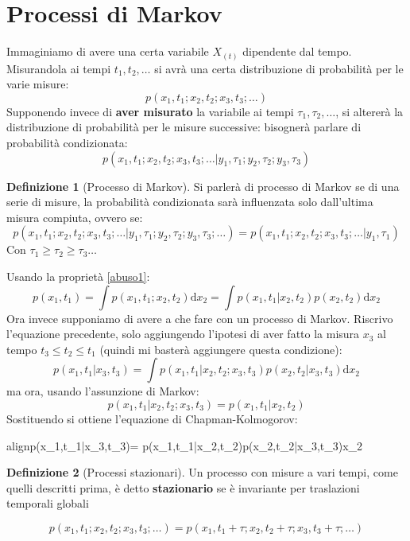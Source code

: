 \documentclass[a4paper,12pt]{article}
\renewcommand{\arg}[1]{_{(#1)}}
\newcommand{\boxedeq}[2]{\begin{empheq}[box={\fboxsep=6pt\fbox}]{align}\label{#1}#2\end{empheq}}
\theoremstyle{plain}
\theoremstyle{definition}
\newtheorem{defn}{Definizione}[section]
\renewcommand{\d}{\text{d}}
\newcommand{\argg}[1]{\left(#1\right)}
\theoremstyle{remark}
\begin{document}
\section{Processi di Markov}
Immaginiamo di avere una certa variabile $X\arg{t}$ dipendente dal tempo. Misurandola ai tempi $t_1,t_2,\ldots$ si avrà una certa distribuzione di probabilità per le varie misure:
\[p\argg{x_1,t_1;x_2,t_2;x_3,t_3;\ldots}		\]
Supponendo invece di \textbf{aver misurato } la variabile ai tempi $\tau_1,\tau_2,\ldots$, si altererà la distribuzione di probabilità per le misure successive: bisognerà parlare di probabilità condizionata:
\[p\argg{x_1,t_1;x_2,t_2;x_3,t_3;\ldots|y_1,\tau_1;y_2,\tau_2;y_3,\tau_3}	\]
\begin{defn}[Processo di Markov]
	Si parlerà di processo di Markov se di una serie di misure, la probabilità condizionata sarà influenzata solo dall'ultima misura compiuta, ovvero se:
\[p\argg{x_1,t_1;x_2,t_2;x_3,t_3;\ldots|y_1,\tau_1;y_2,\tau_2;y_3,\tau_3;\ldots}=p\argg{x_1,t_1;x_2,t_2;x_3,t_3;\ldots|y_1,\tau_1}\]
Con $\tau_1\ge\tau_2\ge\tau_3\ldots$
\end{defn}
Usando la proprietà \ref{abuso1}:
\[p\argg{x_1,t_1}=\int p\argg{x_1,t_1;x_2,t_2}\d x_2=	\int p\argg{x_1,t_1|x_2,t_2}p\argg{x_2,t_2}\d x_2\]
Ora invece supponiamo di avere a che fare con un processo di Markov. Riscrivo l'equazione precedente, solo aggiungendo l'ipotesi di aver fatto la misura $x_3$ al tempo $t_3\le t_2\le t_1$ (quindi mi basterà aggiungere questa condizione):
\[p\argg{x_1,t_1|x_3,t_3}=	\int p\argg{x_1,t_1|x_2,t_2;x_3,t_3}p\argg{x_2,t_2|x_3,t_3}\d x_2\]
ma ora, usando l'assunzione di Markov:
	\[p\argg{x_1,t_1|x_2,t_2;x_3,t_3}=p\argg{x_1,t_1|x_2,t_2}\]
Sostituendo si ottiene l'equazione di Chapman-Kolmogorov:
\boxedeq{Chapman}{p\argg{x_1,t_1|x_3,t_3}=	\int p\argg{x_1,t_1|x_2,t_2}p\argg{x_2,t_2|x_3,t_3}\d x_2}

\begin{defn}[Processi stazionari]
	Un processo con misure a vari tempi, come quelli descritti prima, è detto \textbf{stazionario} se è invariante per traslazioni temporali globali

\[p\argg{x_1,t_1;x_2,t_2;x_3,t_3;\ldots}=
p\argg{x_1,t_1+\tau;x_2,t_2+\tau;x_3,t_3+\tau;\ldots}		\]
\end{defn}
\end{document}
